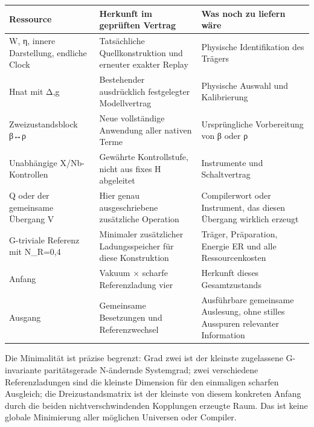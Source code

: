 {\def\LTcaptype{none} %
\begin{longtable}[]{@{}
  >{\raggedright\arraybackslash}p{}
  >{\raggedright\arraybackslash}p{}
  >{\raggedright\arraybackslash}p{}@{}}
\toprule\noalign{}
\begin{minipage}[b]{\linewidth}\raggedright
Ressource
\end{minipage} & \begin{minipage}[b]{\linewidth}\raggedright
Herkunft im geprüften Vertrag
\end{minipage} & \begin{minipage}[b]{\linewidth}\raggedright
Was noch zu liefern wäre
\end{minipage} \\
\midrule\noalign{}
\endhead
\bottomrule\noalign{}
\endlastfoot
W, η, innere Darstellung, endliche Clock & Tatsächliche
Quellkonstruktion und erneuter exakter Replay & Physische Identifikation
des Trägers \\
Hnat mit Δ,g & Bestehender ausdrücklich festgelegter Modellvertrag &
Physische Auswahl und Kalibrierung \\
Zweizustandsblock β↔ρ & Neue vollständige Anwendung aller nativen Terme
& Ursprüngliche Vorbereitung von β oder ρ \\
Unabhängige X/Nb-Kontrollen & Gewährte Kontrollstufe, nicht aus fixes H
abgeleitet & Instrumente und Schaltvertrag \\
Q oder der gemeinsame Übergang V & Hier genau ausgeschriebene
zusätzliche Operation & Compilerwort oder Instrument, das diesen
Übergang wirklich erzeugt \\
G-triviale Referenz mit N\_R=0,4 & Minimaler zusätzlicher
Ladungsspeicher für diese Konstruktion & Träger, Präparation, Energie ER
und alle Ressourcenkosten \\
Anfang & Vakuum × scharfe Referenzladung vier & Herkunft dieses
Gesamtzustands \\
Ausgang & Gemeinsame Besetzungen und Referenzwechsel & Ausführbare
gemeinsame Auslesung, ohne stilles Ausspuren relevanter Information \\
\end{longtable}
}

Die Minimalität ist präzise begrenzt: Grad zwei ist der kleinste
zugelassene G-invariante paritätsgerade N-ändernde Systemgrad; zwei
verschiedene Referenzladungen sind die kleinste Dimension für den
einmaligen scharfen Ausgleich; die Dreizustandsmatrix ist der kleinste
von diesem konkreten Anfang durch die beiden nichtverschwindenden
Kopplungen erzeugte Raum. Das ist keine globale Minimierung aller
möglichen Universen oder Compiler.


